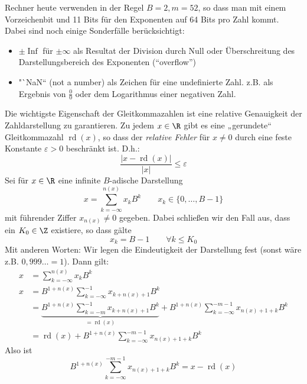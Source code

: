 \documentclass[a4paper]{scrartcl}
\numberwithin{equation}{section}
\DeclareMathOperator{\Inf}{Inf}
\DeclareMathOperator{\rd}{rd}
\begin{document}
Rechner heute verwenden in der Regel $B=2, m=52$, so dass man mit  einem Vorzeichenbit und 11 Bits für den Exponenten auf 64 Bits pro Zahl kommt.
Dabei sind noch einige Sonderfälle berücksichtigt:

\begin{itemize}
\item
$\pm \Inf$ für $\pm\infty$ als Resultat der Division durch Null oder Überschreitung des Darstellungsbereich des Exponenten (“overflow”)
\item
"`NaN`` (not a number) als Zeichen für eine undefinierte Zahl. z.B. als Ergebnis von $\frac 00$ oder dem Logarithmus einer negativen Zahl.
\end{itemize}

Die wichtigste Eigenschaft der Gleitkommazahlen ist eine relative Genauigkeit der Zahldarstellung zu garantieren.
Zu jedem $x\in \R$ gibt es eine „gerundete“ Gleitkommazahl $\rd(x)$, so dass der \emph{relative Fehler} für $x\neq 0$ durch eine feste Konstante $\varepsilon >0$ beschränkt ist.
D.h.:
\begin{equation}
\label{eps}
\frac{|x-\rd(x)|}{|x|}\le \varepsilon
\end{equation}
Sei für $x\in \R$ eine infinite $B$-adische Darstellung
\[
x=\sum_{k=-\infty}^{n(x)}x_kB^k \qquad x_k\in \{0,\dotsc,B-1\}
\]
mit führender Ziffer $x_{n(x)}\neq 0$ gegeben.
Dabei schließen wir den Fall aus, dass ein $K_0\in \Z$ existiere, so dass gälte
\[
	x_k = B-1 \qquad \forall k\le K_0
\]
Mit anderen Worten:
Wir legen die Eindeutigkeit der Darstellung fest (sonst wäre z.B. $0,999\dotso = 1$).
Dann gilt:
\begin{align*}
	x&=\sum_{k=-\infty}^{n(x)}x_kB^k\\
	x&=B^{1+n(x)}\sum_{k=-\infty}^{-1}x_{k+n(x)+1}B^k \\
  &=\underbrace{B^{1+n(x)}\sum_{k=-m}^{-1}x_{k+n(x)+1}B^k}_{=\rd(x)} + B^{1+n(x)}\sum_{k=-\infty}^{-m-1}x_{n(x)+1+k}B^k \\
  &=\rd(x)+B^{1+n(x)}\sum_{k=-\infty}^{-m-1}x_{n(x)+1+k}B^k  
\end{align*}
Also ist
\begin{equation}
	\label{eq:2.2}
	B^{1+n(x)}\sum_{k=-\infty}^{-m-1}x_{n(x)+1+k}B^k = x - \rd(x)
\end{equation}
\end{document}
